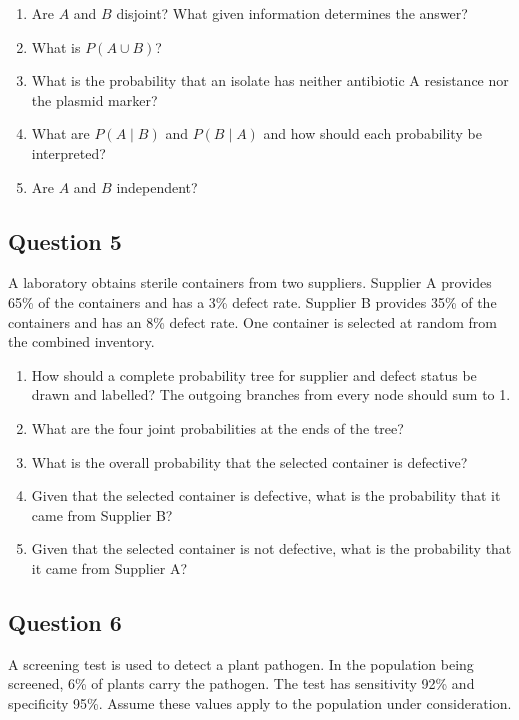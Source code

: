 \documentclass[10pt,letterpaper]{article}
\providecommand{\tightlist}{%
  \setlength{\itemsep}{0pt}\setlength{\parskip}{0pt}}
\begin{document}
\begin{enumerate}
\def\labelenumi{\arabic{enumi}.}
\tightlist
\item Are \(A\) and \(B\) disjoint? What given information determines the answer?
\item What is \(P(A\cup B)\)?
\item What is the probability that an isolate has neither antibiotic A resistance nor the plasmid marker?
\item What are \(P(A\mid B)\) and \(P(B\mid A)\) and how should each probability be interpreted?
\item Are \(A\) and \(B\) independent? 
\end{enumerate}

\subsection*{Question 5}
A laboratory obtains sterile containers from two suppliers. Supplier A provides 65\% of the containers and has a 3\% defect rate. Supplier B provides 35\% of the containers and has an 8\% defect rate. One container is selected at random from the combined inventory.

\begin{enumerate}
\def\labelenumi{\arabic{enumi}.}
\tightlist
	\item How should a complete probability tree for supplier and defect status be drawn and labelled? The outgoing branches from every node should sum to 1.
	\item What are the four joint probabilities at the ends of the tree?
	\item What is the overall probability that the selected container is defective?
	\item Given that the selected container is defective, what is the probability that it came from Supplier B?
	\item Given that the selected container is not defective, what is the probability that it came from Supplier A?
\end{enumerate}

\newpage

\subsection*{Question 6}
A screening test is used to detect a plant pathogen. In the population being screened, 6\% of plants carry the pathogen. The test has sensitivity 92\% and specificity 95\%. Assume these values apply to the population under consideration.
\end{document}

